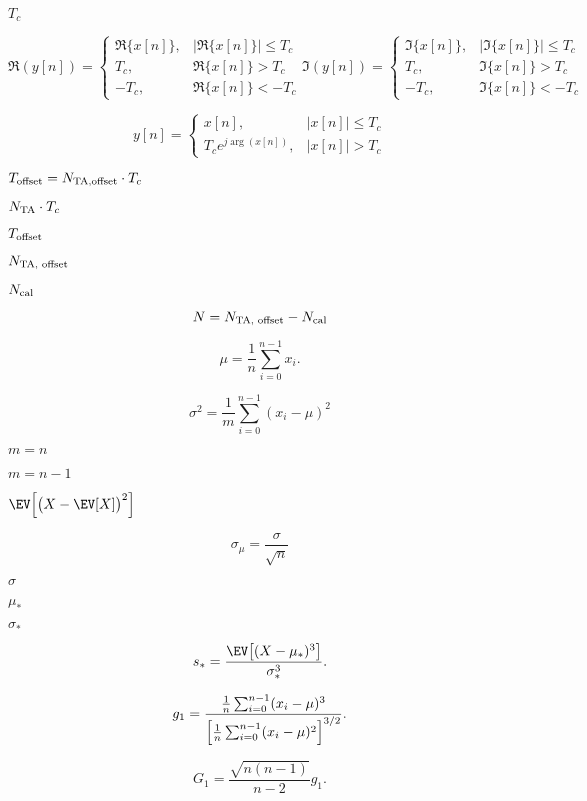 \documentclass{article}
\begin{document}
$ T_c $
\pagebreak

\[
\Re(y[n]) =
\begin{cases}
\Re \{x[n]\},&  \lvert \Re\{x[n]\} \rvert  \leq T_c \\ T_c,& \Re\{x[n]\} > T_c \\ -T_c,& \Re \{x[n]\} < -T_c
\end{cases}
\Im(y[n]) =
\begin{cases}
\Im \{x[n]\},&  \lvert \Im\{x[n]\} \rvert  \leq T_c \\ T_c,& \Im\{x[n]\} > T_c \\ -T_c,& \Im \{x[n]\} < -T_c
\end{cases}
\]
\pagebreak

\[
y[n] =
\begin{cases}
x[n],&  \lvert x[n] \rvert  \leq T_c \\ T_c e^{j\arg(x[n])},&  \lvert x[n] \rvert > T_c
\end{cases}
\]
\pagebreak

$T_{\textup{offset}} = N_{\textup{TA,offset}} \cdot T_c$
\pagebreak

$N_{\textup{TA}} \cdot T_c$
\pagebreak

$T_{\textup{offset}}$
\pagebreak

$N_{\textup{TA, offset}}$
\pagebreak

$N_{\textup{cal}}$
\pagebreak

\[ N= N_{\textup{TA, offset}} - N_{\textup{cal}} \]
\pagebreak

\[
\mu = \frac{1}{n} \sum_{i=0}^{n-1} x_i.
\]
\pagebreak

\[
\sigma^2 = \frac{1}{m} \sum_{i=0}^{n-1} (x_i - \mu)^2
\]
\pagebreak

$m = n$
\pagebreak

$m = n-1$
\pagebreak

$\EV\Bigl[\bigl(X - \EV[X]\bigr)^2\Bigr]$
\pagebreak

\[
\sigma_{\mu} = \frac{\sigma}{\sqrt{n}}
\]
\pagebreak

$\sigma$
\pagebreak

$\mu_*$
\pagebreak

$\sigma_*$
\pagebreak

\[
s_* = \frac{\EV\bigl[(X-\mu_*)^3\bigr]}{\sigma_*^3}.
\]
\pagebreak

\[
g_1 = \frac{\frac{1}{n}\sum_{i=0}^{n-1}(x_i - \mu)^3}{\Bigl[\frac{1}{n}\sum_{i=0}^{n-1}(x_i - \mu)^2\Bigr]^{3/2}}.
\]
\pagebreak

\[
G_1 = \frac{\sqrt{n(n-1)}}{n-2}g_1.
\]
\pagebreak
\end{document}

